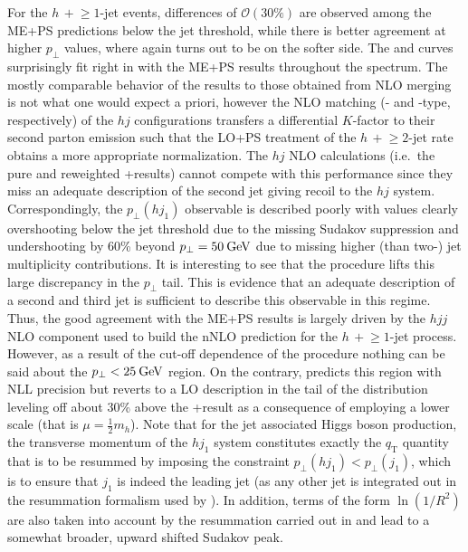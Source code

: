 For the $h\,+\!\ge\!1$-jet events, differences of $\mathcal{O}(30\%)$ are
observed among the ME+PS predictions below the jet threshold, while
there is better agreement at higher $p_\perp$ values, where again
\Herwig turns out to be on the softer side. The \Powheg and \Sherpa \NNLOPS 
curves surprisingly fit right in with the ME+PS results throughout 
the spectrum. The mostly comparable
behavior of the \NNLOPS results to those obtained from NLO merging is
not what one would expect a priori, however the NLO matching (\Powheg- 
and \SMCatNLO-type, respectively) of the $hj$ configurations transfers 
a differential $K$-factor to their second parton emission such that 
the LO+PS treatment of the $h\,+\!\ge\!2$-jet rate
obtains a more appropriate normalization. The $hj$ NLO calculations
(i.e.~the pure and \Minlo reweighted \GoSam{}+\Sherpa results) cannot
compete with this performance since they miss an adequate description 
of the second jet giving recoil to the $hj$ system.
Correspondingly, the $p_\perp(hj_1)$ observable is described poorly
with values clearly overshooting below the jet threshold due to the
missing Sudakov suppression and undershooting by 60\% beyond
$p_\perp=50\text{\:GeV}$ due to missing higher (than two-) jet multiplicity
contributions. It is interesting to see that the \Loopsim procedure
lifts this large discrepancy in the $p_\perp$ tail. This is evidence
that an adequate description of a second and third jet is sufficient
to describe this observable in this regime. Thus, the good agreement
with the ME+PS results is largely driven by the $hjj$ NLO component
used to build the nNLO prediction for the $h\,+\!\ge\!1$-jet
process. However, as a result of the cut-off dependence of the
procedure nothing can be said about the $p_\perp<25\text{\:GeV}$ region.
On the contrary, \Resbos predicts this region with NLL precision but
reverts to a LO description in the tail of the distribution leveling
off about 30\% above the \GoSam{}+\Sherpa result as a consequence of
employing a lower scale (that is $\mu=\tfrac{1}{2}m_h$). Note that for
the jet associated Higgs boson production, the transverse momentum of
the $hj_1$ system constitutes exactly the $q_\text{T}$ quantity that is to be
resummed by \Resbos imposing the constraint $p_\perp(hj_1)<p_\perp(j_1)$,
which is to ensure that $j_1$ is indeed the leading jet (as any other
jet is integrated out in the resummation formalism used by \Resbos).
In addition, terms of the form $\ln(1/R^2)$ are also taken into
account by the resummation carried out in \Resbos and lead to a
somewhat broader, upward shifted Sudakov peak.

